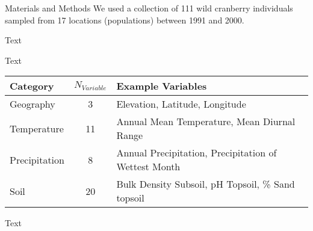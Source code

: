 \documentclass[final]{beamer}
\newlength{\onecolwid}
\begin{document}
\begin{frame}[t]
\begin{columns}[t]
\begin{column}{\onecolwid}
\begin{block}{Materials and Methods}
We used a collection of 111 wild cranberry individuals sampled from 17 locations (populations) between 1991 and 2000.


\begin{figure}
  \begin{center}
  \end{center}
\end{figure}

\vspace{1cm}

Text

\vspace{1cm}

Text


\begin{table}[!h]
\centering
\begin{tabular}{lcl}
\toprule
\textbf{Category} & \textbf{$N_{Variable}$} & \textbf{Example Variables}\\
\midrule
Geography & 3 & Elevation, Latitude, Longitude\\
Temperature & 11 & Annual Mean Temperature, Mean Diurnal
Range\\
Precipitation & 8 & Annual Precipitation, Precipitation of
Wettest Month\\
Soil & 20 & Bulk Density Subsoil, pH Topsoil, \% Sand topsoil\\
\bottomrule
\end{tabular}
\end{table}

\vspace{2cm}

Text


\begin{figure}
  \begin{center}
  \end{center}
\end{figure}


\end{block}





\end{column}
\end{columns}
\end{frame}
\end{document}
